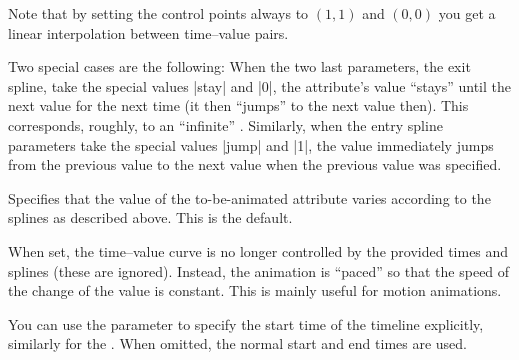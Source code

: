 \begin{command}{\pgfsys@animation@time{}}
  Note that by setting the control points always to $(1,1)$ and
  $(0,0)$ you get a linear interpolation between time--value pairs.

  Two special cases are the following: When the two last parameters,
  the exit spline, take the special values |stay| and |0|, the
  attribute's value ``stays'' until the next value for the next time
  (it then ``jumps'' to the next value then). This corresponds,
  roughly, to an ``infinite'' .
  Similarly, when the entry spline parameters take the special values
  |jump| and |1|, the value immediately jumps from the previous value to
  the next value when the previous value was specified.
  
  \begin{command}{\pgfsys@animation@spline}
    Specifies that the value of the to-be-animated attribute varies
    according to the splines as described above. This is the default.
\begin{codeexample}[width=2cm]
\end{codeexample}
  \end{command}

  \begin{command}{\pgfsys@animation@paced{}}
    When set, the time--value curve is no longer controlled by the
    provided times and splines (these are ignored). Instead, the
    animation is ``paced'' so that the speed of the change of the
    value is constant. This is mainly useful for motion animations.

    You can use the  parameter to specify the start
    time of the timeline explicitly, similarly for the . When omitted, the normal start and end times are used.
\begin{codeexample}[width=2cm]
\end{codeexample}
  \end{command}
 
\end{command}


